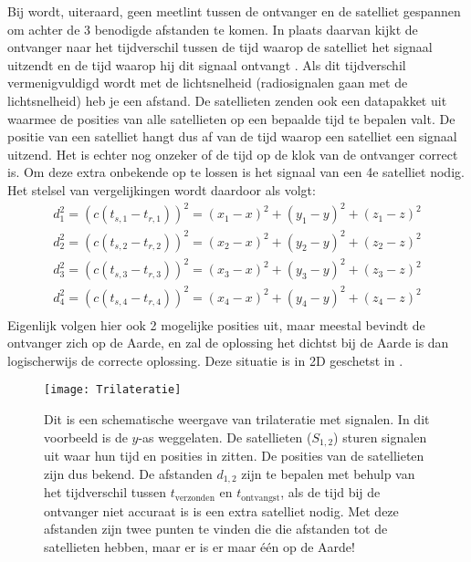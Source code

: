 Bij \gps wordt, uiteraard, geen meetlint tussen de ontvanger en de
satelliet gespannen om achter de 3 benodigde afstanden te komen. In
plaats daarvan kijkt de ontvanger naar het tijdverschil tussen de tijd
waarop de \gps satelliet het signaal uitzendt en de tijd waarop hij dit
signaal ontvangt \cite{blewitt1997gps}. Als dit tijdverschil
vermenigvuldigd wordt met de lichtsnelheid (radiosignalen gaan met de
lichtsnelheid) heb je een afstand. De \gps satellieten zenden ook een
datapakket uit waarmee de posities van alle \gps satellieten op een
bepaalde tijd te bepalen valt. De positie van een \gps satelliet hangt
dus af van de tijd waarop een satelliet een signaal uitzend. Het is
echter nog onzeker of de tijd op de klok van de ontvanger correct is. Om
deze extra onbekende op te lossen is het signaal van een 4e satelliet
nodig. Het stelsel van vergelijkingen wordt daardoor als volgt:
\begin{equation}
    \label{eq:gps_stelsel}
    \begin{array}{rcl}
        d_1^2 = (c(t_{s,1}-t_{r,1}))^2 = (x_1-x)^2+(y_1-y)^2+(z_1-z)^2 \\
        d_2^2 = (c(t_{s,2}-t_{r,2}))^2 = (x_2-x)^2+(y_2-y)^2+(z_2-z)^2 \\
        d_3^2 = (c(t_{s,3}-t_{r,3}))^2 = (x_3-x)^2+(y_3-y)^2+(z_3-z)^2 \\
        d_4^2 = (c(t_{s,4}-t_{r,4}))^2 = (x_4-x)^2+(y_4-y)^2+(z_4-z)^2 \\
    \end{array}
\end{equation}
Eigenlijk volgen hier ook 2 mogelijke posities uit, maar meestal bevindt
de ontvanger zich op de Aarde, en zal de oplossing het dichtst bij de
Aarde is dan logischerwijs de correcte oplossing. Deze situatie is in 2D geschetst in
.

\begin{figure}
    \centering
    \texttt{[image: Trilateratie]}
    \caption{Dit is een schematische weergave van trilateratie met \gps
             signalen. In dit voorbeeld is de $y$-as weggelaten. De
             satellieten ($S_{1,2}$) sturen signalen uit waar hun tijd
             en posities in zitten. De posities van de satellieten zijn
             dus bekend. De afstanden $d_{1,2}$ zijn te bepalen met
             behulp van het tijdverschil tussen $t_\textrm{verzonden}$ en
             $t_\textrm{ontvangst}$, als de tijd bij de ontvanger niet accuraat
             is is een extra satelliet nodig. Met deze afstanden zijn
             twee punten te vinden die die afstanden tot de satellieten
             hebben, maar er is er maar één op de Aarde!}
    \label{fig:Trilateratie}
\end{figure}


